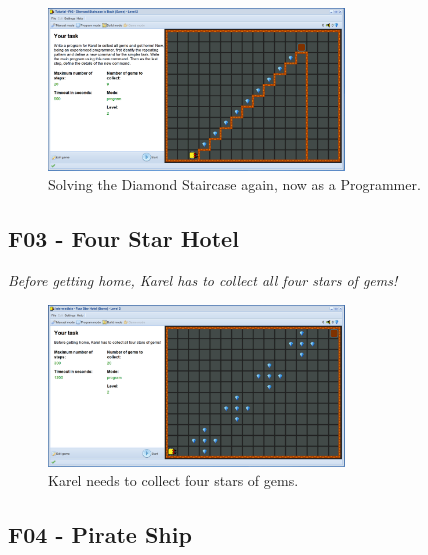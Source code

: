 \documentclass[article,A4,12pt]{llncs}
\begin{document}
\begin{figure}[!ht]
\begin{center}
\includegraphics[width=0.7\textwidth]{img/f02.png}
\end{center}
\vspace{-4mm}
\caption{Solving the Diamond Staircase again, now as a Programmer.}
\label{fig:f02}
\vspace{-10mm}
\end{figure}
\noindent

\subsection{F03 - Four Star Hotel}

{\em Before getting home, Karel has to collect all four stars of gems!}


\begin{figure}[!ht]
\begin{center}
\includegraphics[width=0.7\textwidth]{img/f03.png}
\end{center}
\vspace{-4mm}
\caption{Karel needs to collect four stars of gems.}
\label{fig:f03}
\vspace{-10mm}
\end{figure}
\noindent



\subsection{F04 - Pirate Ship}
\end{document}
